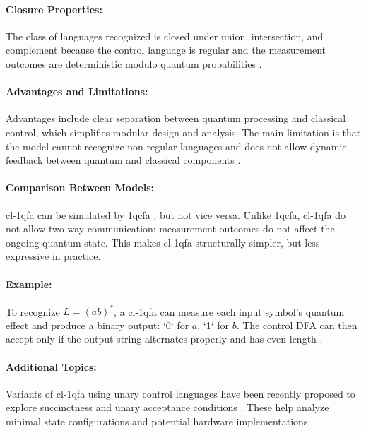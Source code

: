 \paragraph{Closure Properties:}  
The class of languages recognized is closed under union, intersection, and complement because the control language is regular and the measurement outcomes are deterministic modulo quantum probabilities \cite{li2015hybrid}.

\paragraph{Advantages and Limitations:}  
Advantages include clear separation between quantum processing and classical control, which simplifies modular design and analysis. The main limitation is that the model cannot recognize non-regular languages and does not allow dynamic feedback between quantum and classical components \cite{li2015hybrid}.

\paragraph{Comparison Between Models:}  
\gls{cl-1qfa} can be simulated by \gls{1qcfa} \cite{li2015hybrid}, but not vice versa. Unlike \gls{1qcfa}, \gls{cl-1qfa} do not allow two-way communication: measurement outcomes do not affect the ongoing quantum state. This makes \gls{cl-1qfa} structurally simpler, but less expressive in practice.

\paragraph{Example:}  
To recognize $L = (ab)^*$, a \gls{cl-1qfa} can measure each input symbol’s quantum effect and produce a binary output: `0` for $a$, `1` for $b$. The control DFA can then accept only if the output string alternates properly and has even length \cite{mereghetti2006quantum}.

\paragraph{Additional Topics:}  
Variants of \gls{cl-1qfa} using unary control languages have been recently proposed to explore succinctness and unary acceptance conditions \cite{mereghetti2024unary}. These help analyze minimal state configurations and potential hardware implementations.


\subsubsection{}


